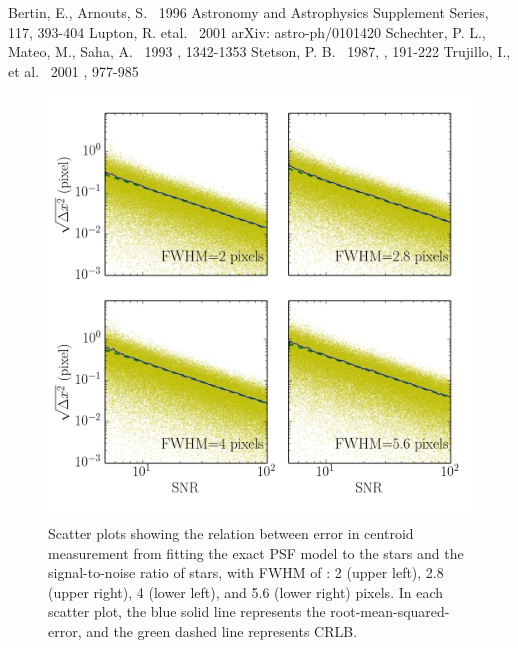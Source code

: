 \documentclass[12pt, preprint]{aastex}
\begin{document}
\begin{thebibliography}{70}

 Bertin, E., Arnouts, S. \ 1996  Astronomy and Astrophysics Supplement Series, 117, 393-404
 Lupton, R. etal. \ 2001  arXiv: astro-ph/0101420
 Schechter, P. L., Mateo, M., Saha, A. \ 1993 \pasp, 1342-1353
 Stetson, P. B. \ 1987, \pasp, 191-222
 Trujillo, I., et al. \ 2001 \mnras, 977-985

\end{thebibliography}

\clearpage

\begin{figure}[!htb]
  \includegraphics[width=\linewidth]{snr_psffitting.png}
\endminipage
\caption{Scatter plots showing the relation between error in centroid measurement
from fitting the exact PSF model to the stars and the signal-to-noise ratio of stars,
with FWHM of : 2 (upper left), 2.8 (upper right), 4 (lower left), and 5.6 (lower right)
pixels. In each scatter plot, the blue solid line represents the root-mean-squared-error, and the green dashed line represents CRLB.}\label{1}
\end{figure}
\end{document}
